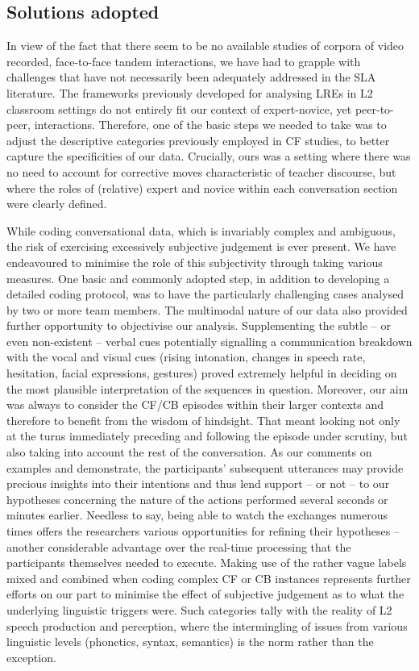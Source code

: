 \documentclass[output=paper,colorlinks,citecolor=brown,modfonts,nonflat]{../langscibook}
\begin{document}
\subsection{Solutions adopted}\label{sec:scheuer:6.2}

In view of the fact that there seem to be no available studies of corpora of video recorded, face-to-face tandem interactions, we have had to grapple with challenges that have not necessarily been adequately addressed in the SLA literature. The frameworks previously developed for analysing LREs in L2 classroom settings do not entirely fit our context of expert-novice, yet peer-to-peer, interactions. Therefore, one of the basic steps we needed to take was to adjust the descriptive categories previously employed in CF studies, to better capture the specificities of our data. Crucially, ours was a setting where there was no need to account for corrective moves characteristic of teacher discourse, but where the roles of (relative) expert and novice within each conversation section were clearly defined.

\largerpage[-1]
While coding conversational data, which is invariably complex and ambiguous, the risk of exercising excessively subjective judgement is ever present. We have endeavoured to minimise the role of this subjectivity through taking various measures. One basic and commonly adopted step, in addition to developing a detailed coding protocol, was to have the particularly challenging cases analysed by two or more team members. The multimodal nature of our data also provided further opportunity to objectivise our analysis. Supplementing the subtle – or even non-existent – verbal cues potentially signalling a communication breakdown with the vocal and visual cues (rising intonation, changes in speech rate, hesitation, facial expressions, gestures) proved extremely helpful in deciding on the most plausible interpretation of the sequences in question. Moreover, our aim was always to consider the CF/CB episodes within their larger contexts and therefore to benefit from the wisdom of hindsight. That meant looking not only at the turns immediately preceding and following the episode under scrutiny, but also taking into account the rest of the conversation. As our comments on examples  and  demonstrate, the participants’ subsequent utterances may provide precious insights into their intentions and thus lend support – or not – to our hypotheses concerning the nature of the actions performed several seconds or minutes earlier. Needless to say, being able to watch the exchanges numerous times offers the researchers various opportunities for refining their hypotheses – another considerable advantage over the real-time processing that the participants themselves needed to execute. Making use of the rather vague labels mixed and combined when coding complex CF or CB instances represents further efforts on our part to minimise the effect of subjective judgement as to what the underlying linguistic triggers were. Such categories tally with the reality of L2 speech production and perception, where the intermingling of issues from various linguistic levels (phonetics, syntax, semantics) is the norm rather than the exception. 
\end{document}
